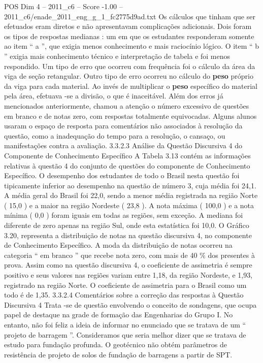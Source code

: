 \begin{textsample}{POS Dim 4 – 2011\_c6 – Score -1.00 – 2011\_c6/enade\_2011\_eng\_g\_1\_fc2775d9ad.txt}
Os cálculos que tinham que ser efetuados eram diretos e não apresentavam complicações adicionais.
Dois foram os tipos de respostas medianas : um em que os estudantes responderam somente ao item “ a ”, que exigia menos conhecimento e mais raciocínio lógico.
O item “ b ” exigia mais conhecimento técnico e interpretação de tabela e foi menos respondido.
Um tipo de erro que ocorreu com frequência foi o cálculo da área da viga de seção retangular.
Outro tipo de erro ocorreu no cálculo do \textbf{peso} próprio da viga para cada material.
Ao invés de multiplicar o \textbf{peso} específico do material pela área, efetuava -se a divisão, o que é inaceitável.
Além dos erros já mencionados anteriormente, chamou a atenção o número excessivo de questões em branco e de notas zero, com respostas totalmente equivocadas.
Alguns alunos usaram o espaço de resposta para comentários não associados à resolução da questão, como a inadequação do tempo para a resolução, o cansaço, ou manifestações contra a avaliação. 3.3.2.3 Análise da Questão Discursiva 4 do Componente de Conhecimento Específico A Tabela 3.13 contém as informações relativas à questão 4 do conjunto de questões do componente de Conhecimento Específico.
O desempenho dos estudantes de todo o Brasil nesta questão foi tipicamente inferior ao desempenho na questão de número 3, cuja média foi 24,1.
A média geral do Brasil foi 22,0, sendo a menor média registrada na região Norte ( 15,0 ) e a maior na região Nordeste ( 23,8 ).
A nota máxima ( 100,0 ) e a nota mínima ( 0,0 ) foram iguais em todas as regiões, sem exceção.
A mediana foi diferente de zero apenas na região Sul, onde esta estatística foi 10,0.
O Gráfico 3.20, representa a distribuição de notas na questão discursiva 4, no componente de Conhecimento Específico.
A moda da distribuição de notas ocorreu na categoria “ em branco ” que recebe nota zero, com mais de 40 \% dos presentes à prova.
Assim como na questão discursiva 4, o coeficiente de assimetria é sempre positivo e seus valores nas regiões variam entre 1,18, da região Nordeste, e 1,93, registrado na região Norte.
O coeficiente de assimetria para o Brasil como um todo é de 1,35. 3.3.2.4 Comentários sobre a correção das respostas à Questão Discursiva 4 Trata -se de questão envolvendo o conceito de sondagens, que ocupa papel de destaque na grade de formação das Engenharias do Grupo I.
No entanto, não foi feliz a ideia de informar no enunciado que se tratava de um “ projeto de barragem ”.
Consideramos que seria melhor dizer que se tratava de estudo para fundação profunda.
O geotécnico não obtém parâmetros de resistência de projeto de solos de fundação de barragens a partir de SPT.

\end{textsample}
